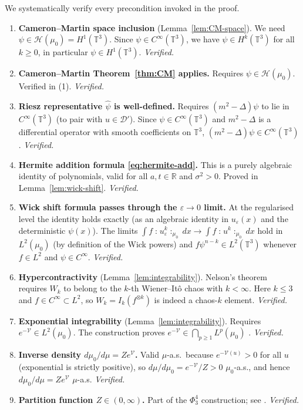 \documentclass[11pt,a4paper]{article}
\theoremstyle{plain}
\theoremstyle{definition}
\newcommand{\T}{\mathbb{T}}
\newcommand{\R}{\mathbb{R}}
\newcommand{\cD}{\mathcal{D}}
\newcommand{\cH}{\mathcal{H}}
\newcommand{\cV}{\mathcal{V}}
\newcommand{\wick}[1]{\mathopen{:}\!#1\!\mathclose{:}}
\begin{document}
We systematically verify every precondition invoked in the proof.

\begin{enumerate}
\item \textbf{Cameron--Martin space inclusion} (Lemma~\ref{lem:CM-space}).
  We need $\psi\in\cH(\mu_0)=H^1(\T^3)$.
  Since $\psi\in C^\infty(\T^3)$, we have $\psi\in H^k(\T^3)$ for all $k\ge0$,
  in particular $\psi\in H^1(\T^3)$.  \textit{Verified.}

\item \textbf{Cameron--Martin Theorem~\ref{thm:CM} applies.}
  Requires $\psi\in\cH(\mu_0)$.  Verified in (1).  \textit{Verified.}

\item \textbf{Riesz representative $\hat\psi$ is well-defined.}
  Requires $(m^2-\Delta)\psi$ to lie in $C^\infty(\T^3)$ (to pair with $u\in\cD'$).
  Since $\psi\in C^\infty(\T^3)$ and $m^2-\Delta$ is a differential operator with smooth
  coefficients on $\T^3$, $(m^2-\Delta)\psi\in C^\infty(\T^3)$.  \textit{Verified.}

\item \textbf{Hermite addition formula \eqref{eq:hermite-add}.}
  This is a purely algebraic identity of polynomials, valid for all $a,t\in\R$ and $\sigma^2>0$.
  Proved in Lemma~\ref{lem:wick-shift}.  \textit{Verified.}

\item \textbf{Wick shift formula passes through the $\varepsilon\to0$ limit.}
  At the regularised level the identity holds exactly (as an algebraic identity in $u_\varepsilon(x)$
  and the deterministic $\psi(x)$).  The limits $\int f\wick{u_\varepsilon^k}_{\mu_0}\,dx \to \int f\wick{u^k}_{\mu_0}\,dx$
  hold in $L^2(\mu_0)$ (by definition of the Wick powers) and $f\psi^{n-k}\in L^2(\T^3)$
  whenever $f\in L^2$ and $\psi\in C^\infty$.  \textit{Verified.}

\item \textbf{Hypercontractivity} (Lemma~\ref{lem:integrability}).
  Nelson's theorem~\cite{Nel73} requires $W_k$ to belong to the $k$-th Wiener--It\^o chaos
  with $k<\infty$.  Here $k\le 3$ and $f\in C^\infty\subset L^2$, so $W_k=I_k(f^{\otimes k})$
  is indeed a chaos-$k$ element.  \textit{Verified.}

\item \textbf{Exponential integrability} (Lemma~\ref{lem:integrability}).
  Requires $e^{-\cV}\in L^2(\mu_0)$.  The construction proves
  $e^{-\cV}\in\bigcap_{p\ge1}L^p(\mu_0)$ \cite{BG20}.  \textit{Verified.}

\item \textbf{Inverse density $d\mu_0/d\mu = Ze^{\cV}$.}
  Valid $\mu$-a.s.\ because $e^{-\cV(u)}>0$ for all $u$ (exponential is strictly positive),
  so $d\mu/d\mu_0 = e^{-\cV}/Z>0$ $\mu_0$-a.s., and hence $d\mu_0/d\mu = Ze^{\cV}$ $\mu$-a.s.
  \textit{Verified.}

\item \textbf{Partition function $Z\in(0,\infty)$.}
  Part of the $\Phi^4_3$ construction; see \cite{GJ87,BG20}.  \textit{Verified.}
\end{enumerate}
\end{document}
